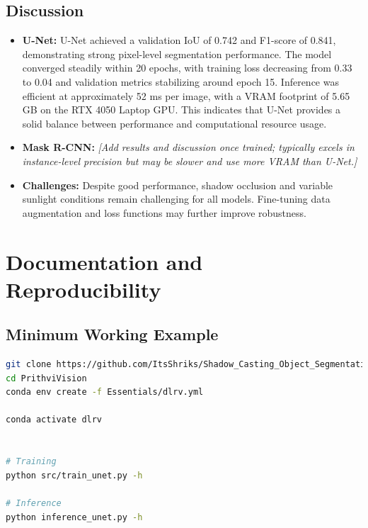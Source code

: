 \documentclass[rnd]{mas_proposal}
\begin{document}
\subsection{Discussion}
\begin{itemize}
    \item \textbf{U-Net:}  
    U-Net achieved a validation IoU of 0.742 and F1-score of 0.841, demonstrating strong pixel-level segmentation performance. 
    The model converged steadily within 20 epochs, with training loss decreasing from 0.33 to 0.04 and validation metrics stabilizing around epoch 15. 
    Inference was efficient at approximately 52 ms per image, with a VRAM footprint of 5.65 GB on the RTX 4050 Laptop GPU.  
    This indicates that U-Net provides a solid balance between performance and computational resource usage.

    \item \textbf{Mask R-CNN:}  
    \textit{[Add results and discussion once trained; typically excels in instance-level precision but may be slower and use more VRAM than U-Net.]}

    
    \item \textbf{Challenges:}  
    Despite good performance, shadow occlusion and variable sunlight conditions remain challenging for all models. 
    Fine-tuning data augmentation and loss functions may further improve robustness.
\end{itemize}
\newpage
\section{Documentation and Reproducibility}

\subsection{Minimum Working Example}

\begin{lstlisting}[language=bash,caption={Running PrithviVision},label={lst:mwe}]
git clone https://github.com/ItsShriks/Shadow_Casting_Object_Segmentation.git
cd PrithviVision
conda env create -f Essentials/dlrv.yml

conda activate dlrv


# Training
python src/train_unet.py -h

# Inference
python inference_unet.py -h
\end{lstlisting}
\end{document}
